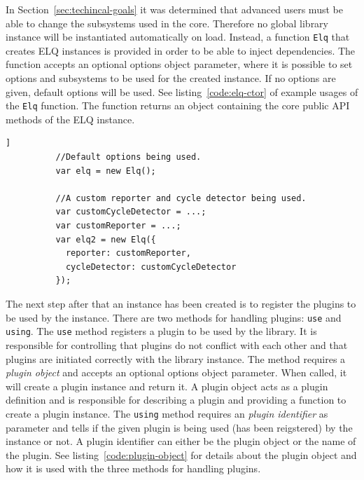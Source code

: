 \documentclass[a4paper,11pt]{kth-mag}
\newcommand{\code}[1]{\texttt{#1}}
\begin{document}
        In Section~\ref{sec:techincal-goals} it was determined that advanced users must be able to change the subsystems used in the core.
        Therefore no global library instance will be instantiated automatically on load.
        Instead, a function \code{Elq} that creates \gls{ELQ} instances is provided in order to be able to inject dependencies.
        The function accepts an optional options object parameter, where it is possible to set options and subsystems to be used for the created instance.
        If no options are given, default options will be used.
        See listing~\ref{code:elq-ctor} of example usages of the \code{Elq} function.
        The function returns an object containing the core public \gls{API} methods of the \gls{ELQ} instance.
        \begin{lstlisting}[gobble=10,caption={Example usages of the \code{Elq} function that creates \gls{ELQ} instances.},captionpos=b,label={code:elq-ctor}]]
          //Default options being used.
          var elq = new Elq();

          //A custom reporter and cycle detector being used.
          var customCycleDetector = ...;
          var customReporter = ...;
          var elq2 = new Elq({
            reporter: customReporter,
            cycleDetector: customCycleDetector
          });
        \end{lstlisting}

        The next step after that an instance has been created is to register the plugins to be used by the instance.
        There are two methods for handling plugins: \code{use} and \code{using}.
        The \code{use} method registers a plugin to be used by the library.
        It is responsible for controlling that plugins do not conflict with each other and that plugins are initiated correctly with the library instance.
        The method requires a \emph{plugin object} and accepts an optional options object parameter.
        When called, it will create a plugin instance and return it.
        A plugin object acts as a plugin definition and is responsible for describing a plugin and providing a function to create a plugin instance.
        The \code{using} method requires an \emph{plugin identifier} as parameter and tells if the given plugin is being used (has been reigstered) by the instance or not.
        A plugin identifier can either be the plugin object or the name of the plugin.
        See listing~\ref{code:plugin-object} for details about the plugin object and how it is used with the three methods for handling plugins.
\end{document}
